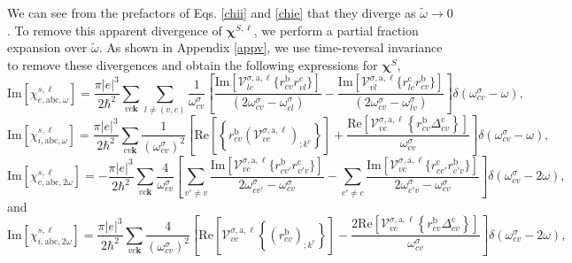 We can see from the prefactors of Eqs. \eqref{chii} and \eqref{chie} 
that they diverge as $\tilde{\omega}\to 0$. To remove this apparent divergence of 
$\boldsymbol{\chi}^{S,\ell}$, we perform a partial fraction expansion over $\tilde{\omega}$. 
As shown in Appendix \ref{appv}, we use time-reversal invariance to 
remove these divergences and obtain the following expressions for $\boldsymbol{\chi}^S$,
\begin{equation}\label{calvimchiewn}
\mathrm{Im}[\chi_{e,\mathrm{abc},\omega}^{s,\ell}] =
\frac{\pi |e|^3}{2\hbar^2}\sum_{vc\mathbf{k}}\sum_{l\neq(v,c)}\frac{1}{\omega^\sigma_{cv}}
\left[
\frac{\mathrm{Im}[\mathcal{V}^{\sigma,\text{a},\ell}_{lc}\{r^{\mathrm{b}}_{cv}r^{\mathrm{c}}_{vl}\}]}
{(2\omega^\sigma_{cv}-\omega^\sigma_{cl})} 
-\frac{\mathrm{Im}[\mathcal{V}^{\sigma,\text{a},\ell}_{vl}\{r^{\mathrm{c}}_{lc}r^{\mathrm{b}}_{cv}\}]}
{(2\omega^\sigma_{cv}-\omega^\sigma_{lv})}
\right]\delta(\omega^\sigma_{cv}-\omega),
\end{equation}  
\begin{equation}\label{calvimchiwn}
\mathrm{Im}[\chi_{i,\text{a}\text{b}\text{c},\omega}^{s,\ell}]
= \frac{\pi\vert e\vert^3}{2\hbar^2}\sum_{cv\mathbf{k}}\frac{1}{(\omega^\sigma_{cv})^{2}}
\left[
\mathrm{Re}\left[\left\{r^{\text{b}}_{cv}\left(\mathcal{V}^{\sigma,\text{a},\ell}_{vc}\right)_{;k^{\text{c}}}\right\}\right]
+\frac{\mathrm{Re}\left[\mathcal{V}^{\sigma,\text{a},\ell}_{vc}\left\{r^{\text{b}}_{cv}
\Delta^{\text{c}}_{cv}\right\}\right]}{\omega^\sigma_{cv}} 
\right]\delta(\omega^\sigma_{cv}-\omega),
\end{equation}
\begin{equation}\label{calvimchie2wn}
\mathrm{Im}[\chi_{e,\mathrm{abc},2\omega}^{s,\ell}] =
-\frac{\pi |e|^3}{2\hbar^2}\sum_{vc\mathbf{k}}\frac{4}{\omega^\sigma_{cv}}
\left[
\sum_{v'\ne
  v}\frac{\mathrm{Im}[\mathcal{V}^{\sigma,\text{a},\ell}_{vc}\{r^{\mathrm{b}}_{cv'}r^{\mathrm{c}}_{v'v}\}]}
{2\omega^\sigma_{cv'}-\omega^\sigma_{cv}}
- \sum_{c'\ne
  c}\frac{\mathrm{Im}[\mathcal{V}^{\sigma,\text{a},\ell}_{vc}\{r^{\mathrm{c}}_{cc'}r^{\mathrm{b}}_{c'v}\}]}
{2\omega^\sigma_{c'v}-\omega^\sigma_{cv}}
\right]\delta(\omega^\sigma_{cv}-2\omega),
\end{equation}
and
\begin{equation}\label{calvimchi2wn}
\mathrm{Im}[\chi_{i,\text{a}\text{b}\text{c},2\omega}^{s,\ell}] 
=
 \frac{\pi \vert
   e\vert^{3}}{2\hbar^2}\sum_{vc\mathbf{k}}\frac{4}{(\omega^\sigma_{cv})^{2}}
\left[\mathrm{Re}\left[\mathcal{V}^{\sigma,\text{a},\ell}_{vc}\left\{\left(r^{\text{b}}_{cv}\right)_{;k^{\text{c}}}
\right\}\right] -
\frac{2\mathrm{Re}\left[\mathcal{V}^{\sigma,\text{a},\ell}_{vc}\left\{r^{\text{b}}_{cv}
\Delta^{\text{c}}_{cv}\right\}\right]}{\omega^\sigma_{cv}}\right]\delta(\omega^\sigma_{cv}-2\omega)
,
\end{equation}
